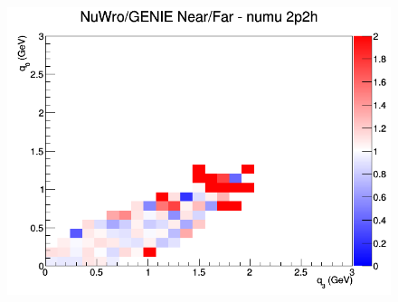 \documentclass[12pt]{article}
\begin{document}
\begin{figure}[h]
\endminipage
{}
\includegraphics[width=\linewidth]{eff_q0_q3/LAr/ratios/2p2h_NuWro_GENIE_numu_NF_q3_q0.png}
\endminipage
\newline
\end{figure}
\clearpage
\end{document}
